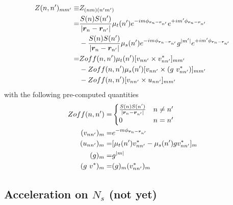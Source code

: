 \documentclass [10pt,letterpaper]{article}
\renewcommand{\vec}{\vectorsym}
\begin{document}
\begin{equation} \label{eq:def-Znnp-off-diagonal}
	\begin{split}
		Z(n,n^\prime)_{m m^\prime}
		\equiv &
		Z_{(n m)(n^\prime m^\prime)}
		\\
		=& 
		\frac{S(n) S(n^\prime)}{\lvert \vec{r}_n-\vec{r}_{n^\prime} \rvert} 
		\mu_t(n^\prime)
		e^{-i m \phi_{\vec{r}_n-\vec{r}_{n^\prime}}}
		e^{+i m^\prime \phi_{\vec{r}_n-\vec{r}_{n^\prime}}}
		\\
		&- 
		\frac{S(n) S(n^\prime)}{\lvert \vec{r}_n-\vec{r}_{n^\prime} \rvert} 
		\mu_s(n^\prime)
		e^{-i m \phi_{\vec{r}_n-\vec{r}_{n^\prime}}}
		g^{\lvert m^\prime \rvert} 
		e^{+i m^\prime \phi_{\vec{r}_n-\vec{r}_{n^\prime}}}
		\\
		=& 
		Zoff(n,n^\prime)
		\mu_t(n^\prime)
		[
			v_{n n^\prime}
			\times
			v^*_{n n^\prime} 
		]
		_{m m^\prime}
		\\
		&- 
		Zoff(n,n^\prime)
		\mu_s(n^\prime)
		[
			v_{n n^\prime}
			\times
			(g\ v^*_{n n^\prime})
		]
		_{m m^\prime}
		\\
		&- 
		Zoff(n,n^\prime)
		[
			v_{n n^\prime}
			\times
			u_{n n^\prime}
		]_{m m^\prime}
	\end{split}
\end{equation}
with the following pre-computed quantities
\begin{subequations} \label{eq:def-Zoff-v-u-g}
	\begin{align}
		Zoff(n,n^\prime)
		=&
		\begin{cases}
			\frac
			{S(n)S(n^\prime)}
			{\lvert \vec{r}_n-\vec{r}_{n^\prime} \rvert} 
			&
			n \neq n^\prime
			\\
			0
			&
			n=n^\prime 
		\end{cases}
		\label{eq:def-Zoffnnp}
		\\
		(v_{n n^\prime})_m
		=&
		e^{- m \phi_{\vec{r}_n-\vec{r}_{n^\prime}}}
		\label{eq:def-vnnp}
		\\
		(u_{n n^\prime})_m
		=&
		[
			\mu_t(n^\prime)
			v^*_{n n^\prime}
			-
			\mu_s(n^\prime)
			g
			v^*_{n n^\prime}
		]_m
		\label{eq:def-unnp}
		\\
		(g)_m
		=&
		g^{\lvert m \rvert}
		\\
		(g\ v^*)_m
		=&
		(g)_m
		(v^*_{n n^\prime})_m 
		\label{eq:def-gm}
	\end{align}
\end{subequations}

\subsection{Acceleration on $N_s$ (not yet)}
\label{sub:acceleration-on-Ns}
\end{document}
